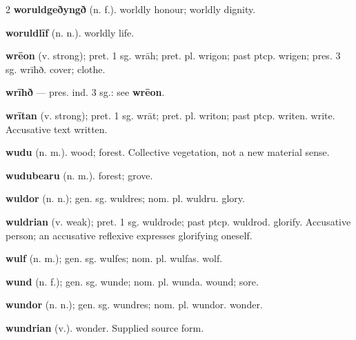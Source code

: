 \begin{multicols*}{2}
\textbf{woruldgeðyngð} (n. f.). worldly honour; worldly dignity.\par
\textbf{woruldlīf} (n. n.). worldly life.\par
\textbf{wrēon} (v. strong); pret. 1 sg. wrāh; pret. pl. wrigon; past ptcp. wrigen; pres. 3 sg. wrīhð. cover; clothe.\par
\textbf{wrīhð} — pres. ind. 3 sg.: see \textbf{wrēon}.\par
\textbf{wrītan} (v. strong); pret. 1 sg. wrāt; pret. pl. writon; past ptcp. writen. write. Accusative text written.\par
\textbf{wudu} (n. m.). wood; forest. Collective vegetation, not a new material sense.\par
\textbf{wudubearu} (n. m.). forest; grove.\par
\textbf{wuldor} (n. n.); gen. sg. wuldres; nom. pl. wuldru. glory.\par
\textbf{wuldrian} (v. weak); pret. 1 sg. wuldrode; past ptcp. wuldrod. glorify. Accusative person; an accusative reflexive expresses glorifying oneself.\par
\textbf{wulf} (n. m.); gen. sg. wulfes; nom. pl. wulfas. wolf.\par
\textbf{wund} (n. f.); gen. sg. wunde; nom. pl. wunda. wound; sore.\par
\textbf{wundor} (n. n.); gen. sg. wundres; nom. pl. wundor. wonder.\par
\textbf{wundrian} (v.). wonder. Supplied source form.\par

\end{multicols*}
